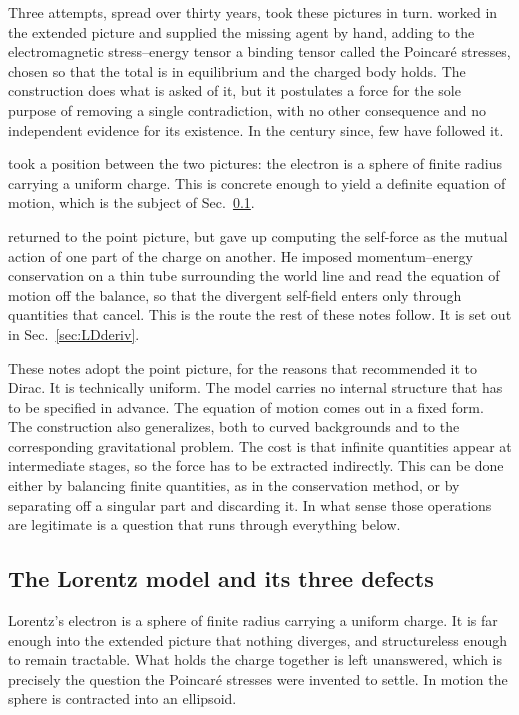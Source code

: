 \documentclass[preprint]{aastex701}
\begin{document}
Three attempts, spread over thirty years, took these pictures in turn.
\citet{poincare1906} worked in the extended picture and supplied the missing agent
by hand, adding to the electromagnetic stress--energy tensor a binding tensor
called the Poincar\'e stresses, chosen so that the total is in equilibrium and
the charged body holds. The construction does what is asked of it, but it
postulates a force for the sole purpose of removing a single contradiction, with
no other consequence and no independent evidence for its existence. In the
century since, few have followed it.

\citet{lorentz1909} took a position between the two pictures: the electron is a
sphere of finite radius carrying a uniform charge. This is concrete enough to
yield a definite equation of motion, which is the subject of
Sec.~\ref{sec:lorentzmodel}.

\citet{dirac1938} returned to the point picture, but gave up computing the self-force
as the mutual action of one part of the charge on another. He imposed
momentum--energy conservation on a thin tube surrounding the world line and read
the equation of motion off the balance, so that the divergent self-field enters
only through quantities that cancel. This is the route the rest of these notes
follow. It is set out in Sec.~\ref{sec:LDderiv}.

These notes adopt the point picture, for the reasons that recommended it to
Dirac. It is technically uniform. The model carries no internal structure that
has to be specified in advance. The equation of motion comes out in a fixed
form. The construction also generalizes, both to curved backgrounds and to the
corresponding gravitational problem. The cost is that infinite quantities appear
at intermediate stages, so the force has to be extracted indirectly. This can be
done either by balancing finite quantities, as in the conservation method, or by
separating off a singular part and discarding it. In what sense those operations
are legitimate is a question that runs through everything below.

\subsection{The Lorentz model and its three defects}
\label{sec:lorentzmodel}

Lorentz's electron is a sphere of finite radius carrying a uniform charge. It is
far enough into the extended picture that nothing diverges, and structureless
enough to remain tractable. What holds the charge together is left unanswered, which is
precisely the question the Poincar\'e stresses were invented to settle. In
motion the sphere is contracted into an ellipsoid.
\end{document}
